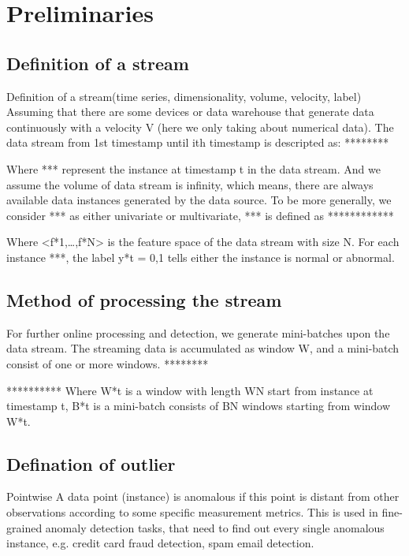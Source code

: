 \chapter{Preliminaries}
\label{Preliminaries}

\section{Definition of a stream}
\label{sec:Definition of a stream}

Definition of a stream(time series, dimensionality, volume, velocity, label)
Assuming that there are some devices or data warehouse that generate data continuously with a velocity V (here we only taking about numerical data). The data stream from 1st timestamp until ith timestamp is descripted as:
	                             ********
	
Where *** represent the instance at timestamp t in the data stream. And we assume the volume of data stream is infinity, which means, there are always available data instances generated by the data source.
To be more generally, we consider *** as either univariate or multivariate, *** is defined as 
				************

Where <f*1,…,f*N> is the feature space of the data stream with size N. For each instance ***, the label y*t = {0,1} tells either the instance is normal or abnormal.


\section{Method of processing the stream}
\label{sec:Method of processing the stream}

For further online processing and detection, we generate mini-batches upon the data stream. The streaming data is accumulated as window W, and a mini-batch consist of one or more windows.
	                             ********

			**********
Where W*t is a window with length WN start from instance at timestamp t, B*t is a mini-batch consists of BN windows starting from window  W*t.

\section{Defination of outlier}
\label{sec:Defination of outlier}

Pointwise
A data point (instance) is anomalous if this point is distant from other observations according to some specific measurement metrics. This is used in fine-grained anomaly detection tasks, that need to find out every single anomalous instance, e.g. credit card fraud detection, spam email detection.

